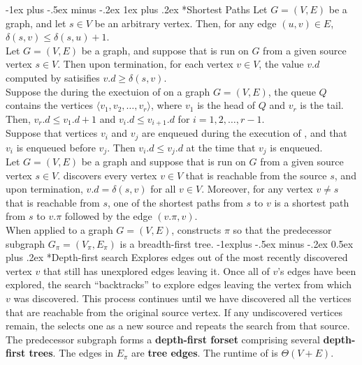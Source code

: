 \documentclass[10pt,landscape]{article}
\makeatletter
\renewcommand{\subsection}{\@startsection{subsection}{2}{0mm}%
                                {-1explus -.5ex minus -.2ex}%
                                {0.5ex plus .2ex}%
                                {\normalfont\normalsize\bfseries}}
\renewcommand{\subsubsection}{\@startsection{subsubsection}{3}{0mm}%
                                {-1ex plus -.5ex minus -.2ex}%
                                {1ex plus .2ex}%
                                {\normalfont\small\bfseries}}
\makeatother
\begin{document}
\begin{multicols}{3}
\subsubsection*{Shortest Paths}
\scriptsize{
Let $G = (V, E)$ be a graph, and let $s \in V$ be an arbitrary vertex. Then, for any edge $(u, v) \in E$, $\delta(s,v) \leq \delta(s, u) + 1$.\\
Let $G=(V,E)$ be a graph, and suppose that  is run on $G$ from a given source vertex $s \in V$. Then upon termination, for each vertex $v \in V$, the value $v.d$ computed by  satisifies $v.d \geq \delta(s,v)$.\\
Suppose the during the exectuion of  on a graph $G=(V,E)$, the queue $Q$ contains the vertices $\langle v_1, v_2,\ldots,v_r\rangle$, where $v_1$ is the head of $Q$ and $v_r$ is the tail. Then, $v_r.d \leq v_1.d + 1$ and $v_i.d \leq v_{i+1}.d$ for $i = 1, 2, \ldots, r-1$.\\
Suppose that vertices $v_i$ and $v_j$ are enqueued during the execution of , and that $v_i$ is enqueued before $v_j$. Then $v_i.d \leq v_j.d$ at the time that $v_j$ is enqueued.\\
Let $G=(V,E)$ be a graph and suppose that  is run on $G$ from a given source vertex $s \in V$.  discovers every vertex $v \in V$ that is reachable from the source $s$, and upon termination, $v.d = \delta(s,v)$ for all $v \in V$. Moreover, for any vertex $v \neq s$ that is reachable from $s$, one of the shortest paths from $s$ to $v$ is a shortest path from $s$ to $v.\pi$ followed by the edge $(v.\pi, v)$. \\
When applied to a graph $G = (V, E)$,  constructs $\pi$ so that the predecessor subgraph $G_\pi = (V_\pi, E_\pi)$ is a breadth-first tree.
}
\subsection*{Depth-first search}
\scriptsize{
Explores edges out of the most recently discovered vertex $v$ that still has unexplored edges leaving it. Once all of $v$'s edges have been explored, the search ``backtracks'' to explore edges leaving the vertex from which $v$ was discovered. This process continues until we have discovered all the vertices that are reachable from the original source vertex. If any undiscovered vertices remain, the  selects one as a new source and repeats the search from that source.\\
The predecessor subgraph forms a \textbf{depth-first forset} comprising several \textbf{depth-first trees}. The edges in $E_\pi$ are \textbf{tree edges}. The runtime of  is $\Theta(V + E)$.
}

\end{multicols}
\end{document}
